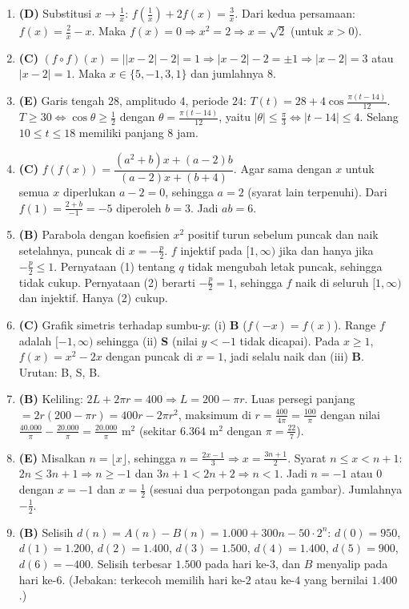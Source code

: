 \documentclass[a4paper,11pt]{article}
\begin{document}
\begin{enumerate}[leftmargin=2em,itemsep=2pt,topsep=2pt]
\item[\textbf{12.}] \textbf{(D)} Substitusi $x\to\frac1x$: $f(\frac1x)+2f(x)=\frac3x$. Dari kedua persamaan: $f(x)=\frac2x-x$. Maka $f(x)=0\Rightarrow x^2=2\Rightarrow x=\sqrt2$ (untuk $x>0$).
\item[\textbf{13.}] \textbf{(C)} $(f\circ f)(x)=\big||x-2|-2\big|=1\Rightarrow|x-2|-2=\pm1\Rightarrow|x-2|=3$ atau $|x-2|=1$. Maka $x\in\{5,-1,3,1\}$ dan jumlahnya $8$.
\item[\textbf{14.}] \textbf{(E)} Garis tengah $28$, amplitudo $4$, periode $24$: $T(t)=28+4\cos\frac{\pi(t-14)}{12}$. $T\ge30\iff\cos\theta\ge\frac12$ dengan $\theta=\frac{\pi(t-14)}{12}$, yaitu $|\theta|\le\frac\pi3\iff|t-14|\le4$. Selang $10\le t\le18$ memiliki panjang $8$ jam.
\item[\textbf{15.}] \textbf{(C)} $f(f(x))=\dfrac{(a^2+b)x+(a-2)b}{(a-2)x+(b+4)}$. Agar sama dengan $x$ untuk semua $x$ diperlukan $a-2=0$, sehingga $a=2$ (syarat lain terpenuhi). Dari $f(1)=\frac{2+b}{-1}=-5$ diperoleh $b=3$. Jadi $ab=6$.
\item[\textbf{16.}] \textbf{(B)} Parabola dengan koefisien $x^2$ positif turun sebelum puncak dan naik setelahnya, puncak di $x=-\frac p2$. $f$ injektif pada $[1,\infty)$ jika dan hanya jika $-\frac p2\le1$. Pernyataan (1) tentang $q$ tidak mengubah letak puncak, sehingga tidak cukup. Pernyataan (2) berarti $-\frac p2=1$, sehingga $f$ naik di seluruh $[1,\infty)$ dan injektif. Hanya (2) cukup.
\item[\textbf{17.}] \textbf{(C)} Grafik simetris terhadap sumbu-$y$: (i) \textbf{B} ($f(-x)=f(x)$). Range $f$ adalah $[-1,\infty)$ sehingga (ii) \textbf{S} (nilai $y<-1$ tidak dicapai). Pada $x\ge1$, $f(x)=x^2-2x$ dengan puncak di $x=1$, jadi selalu naik dan (iii) \textbf{B}. Urutan: B, S, B.
\item[\textbf{18.}] \textbf{(B)} Keliling: $2L+2\pi r=400\Rightarrow L=200-\pi r$. Luas persegi panjang $=2r(200-\pi r)=400r-2\pi r^2$, maksimum di $r=\frac{400}{4\pi}=\frac{100}\pi$ dengan nilai $\frac{40.000}\pi-\frac{20.000}\pi=\frac{20.000}\pi$ m$^2$ (sekitar $6.364$ m$^2$ dengan $\pi=\frac{22}{7}$).
\item[\textbf{19.}] \textbf{(E)} Misalkan $n=\lfloor x\rfloor$, sehingga $n=\frac{2x-1}3\Rightarrow x=\frac{3n+1}2$. Syarat $n\le x<n+1$: $2n\le3n+1\Rightarrow n\ge-1$ dan $3n+1<2n+2\Rightarrow n<1$. Jadi $n=-1$ atau $0$ dengan $x=-1$ dan $x=\frac12$ (sesuai dua perpotongan pada gambar). Jumlahnya $-\frac12$.
\item[\textbf{20.}] \textbf{(B)} Selisih $d(n)=A(n)-B(n)=1.000+300n-50\cdot2^n$: $d(0)=950$, $d(1)=1.200$, $d(2)=1.400$, $d(3)=1.500$, $d(4)=1.400$, $d(5)=900$, $d(6)=-400$. Selisih terbesar $1.500$ pada hari ke-$3$, dan $B$ menyalip pada hari ke-$6$. (Jebakan: terkecoh memilih hari ke-$2$ atau ke-$4$ yang bernilai $1.400$.)
\end{enumerate}
\end{document}

